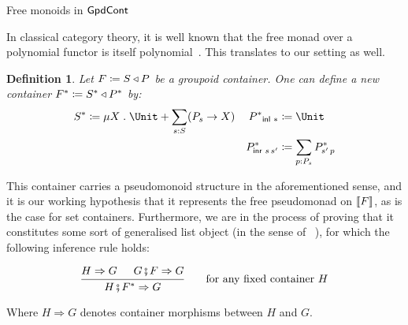 \documentclass[a4paper]{easychair}
\newtheorem*{definition}{Definition}
\begin{document}
\begin{section}{Free monoids in \(\mathsf{GpdCont}\)}

  In classical category theory, it is well known that the free monad over a
  polynomial functor is itself polynomial~\cite{Gambino2009}. This translates to
  our setting as well.

  \begin{definition}
    Let \(F \coloneq S \mathbin{\triangleleft} P\) be a groupoid container. One can define a new
    container \(F^* \coloneq S^* \mathbin{\triangleleft} P^*\) by:
    \begin{align*}
      S^* & \defas \mu X \; . \; \Unit + \sum_{s : S} (P_s \to X) & {P^*}_{\inl \,*}     & \defas \Unit                       \\
          &                                                       & P^*_{\inr \, s\, s'} & \defas \sum_{p : P_s} P^*_{s'\, p}
    \end{align*}
  \end{definition}

  This container carries a pseudomonoid structure in the aforementioned sense,
  and it is our working hypothesis that it represents the free pseudomonad on
  \(\llbracket{F}\rrbracket\), as is the case for set containers. Furthermore, we are in the
  process of proving that it constitutes some sort of generalised list object
  (in the sense of ~\cite{Fiore2017}), for which the following inference rule
  holds:

  \[
    \begin{prooftree}
      \hypo{H \Rightarrow G}
      \hypo{G \csubst F \Rightarrow G}
      \infer2{H \csubst F^* \Rightarrow G}
    \end{prooftree}
    \qquad \text{for any fixed container \(H\)}
  \]

  Where \(H \Rightarrow G\) denotes container morphisms between \(H\) and \(G\).

\end{section}





\end{document}
